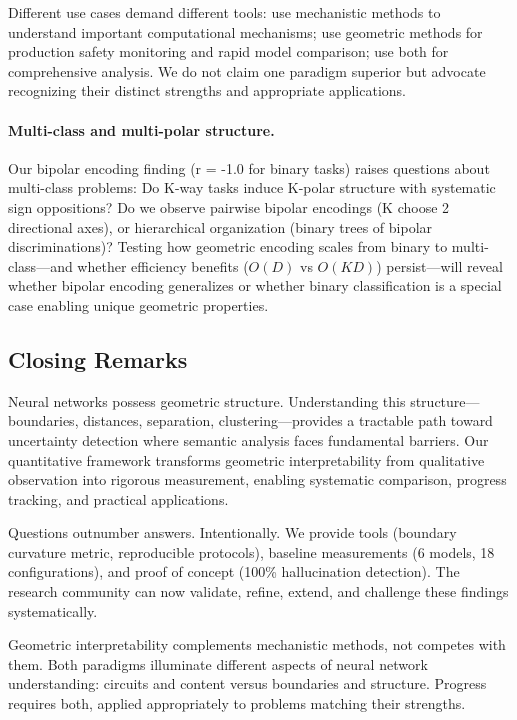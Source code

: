 \documentclass[11pt]{article}
\begin{document}
Different use cases demand different tools: use mechanistic methods to understand important computational mechanisms; use geometric methods for production safety monitoring and rapid model comparison; use both for comprehensive analysis. We do not claim one paradigm superior but advocate recognizing their distinct strengths and appropriate applications.

\paragraph{Multi-class and multi-polar structure.} Our bipolar encoding finding (r = -1.0 for binary tasks) raises questions about multi-class problems: Do K-way tasks induce K-polar structure with systematic sign oppositions? Do we observe pairwise bipolar encodings (K choose 2 directional axes), or hierarchical organization (binary trees of bipolar discriminations)? Testing how geometric encoding scales from binary to multi-class---and whether efficiency benefits ($O(D)$ vs $O(KD)$) persist---will reveal whether bipolar encoding generalizes or whether binary classification is a special case enabling unique geometric properties.

\subsection{Closing Remarks}

Neural networks possess geometric structure. Understanding this structure---boundaries, distances, separation, clustering---provides a tractable path toward uncertainty detection where semantic analysis faces fundamental barriers. Our quantitative framework transforms geometric interpretability from qualitative observation into rigorous measurement, enabling systematic comparison, progress tracking, and practical applications.

Questions outnumber answers. Intentionally. We provide tools (boundary curvature metric, reproducible protocols), baseline measurements (6 models, 18 configurations), and proof of concept (100\% hallucination detection). The research community can now validate, refine, extend, and challenge these findings systematically.

Geometric interpretability complements mechanistic methods, not competes with them. Both paradigms illuminate different aspects of neural network understanding: circuits and content versus boundaries and structure. Progress requires both, applied appropriately to problems matching their strengths.
\end{document}
